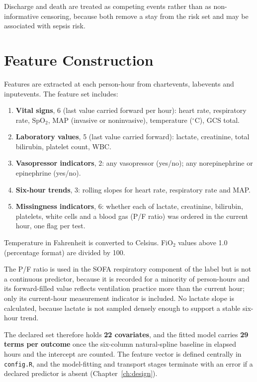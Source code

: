 Discharge and death are treated as competing events rather than as
non-informative censoring, because both remove a stay from the risk set and
may be associated with sepsis risk.


\section{Feature Construction}
\label{sec:features}

Features are extracted at each person-hour from chartevents, labevents and
inputevents. The feature set includes:

\begin{enumerate}
    \item \textbf{Vital signs}, 6 (last value carried forward per hour): heart
    rate, respiratory rate, SpO$_2$, MAP (invasive or noninvasive), temperature
    ($^\circ$C), GCS total.
    \item \textbf{Laboratory values}, 5 (last value carried forward): lactate,
    creatinine, total bilirubin, platelet count, WBC.
    \item \textbf{Vasopressor indicators}, 2: any vasopressor (yes/no); any
    norepinephrine or epinephrine (yes/no).
    \item \textbf{Six-hour trends}, 3: rolling slopes for heart rate,
    respiratory rate and MAP.
    \item \textbf{Missingness indicators}, 6: whether each of lactate,
    creatinine, bilirubin, platelets, white cells and a blood gas
    (P/F ratio) was ordered in the current hour, one flag per test.
\end{enumerate}

Temperature in Fahrenheit is converted to Celsius. FiO$_2$ values above 1.0
(percentage format) are divided by 100.

The P/F ratio is used in the SOFA respiratory component of the label but is
not a continuous predictor, because it is recorded for a minority of
person-hours and its forward-filled value reflects ventilation practice more
than the current hour; only its current-hour measurement indicator is
included. No lactate slope is calculated, because lactate is not sampled
densely enough to support a stable six-hour trend.

The declared set therefore holds \textbf{22 covariates}, and the fitted model
carries \textbf{29 terms per outcome} once the six-column natural-spline
baseline in elapsed hours and the intercept are counted. The feature vector is
defined centrally in \texttt{config.R}, and the model-fitting and transport
stages terminate with an error if a declared predictor is absent
(Chapter~\ref{ch:design}).


